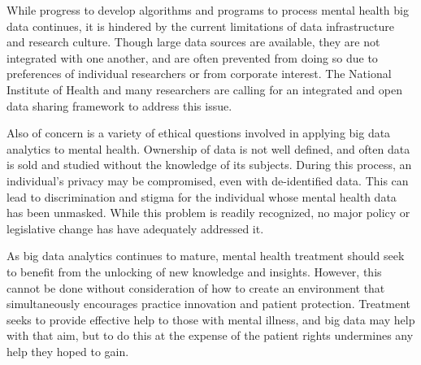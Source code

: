 \documentclass[sigconf]{acmart}
\begin{document}
While progress to develop algorithms and programs to process mental health big data continues, it is hindered by the current limitations of data infrastructure and research culture. Though large data sources are available, they are not integrated with one another, and are often prevented from doing so due to preferences of individual researchers or from corporate interest. The National Institute of Health and many researchers are calling for an integrated and open data sharing framework to address this issue.

Also of concern is a variety of ethical questions involved in applying big data analytics to mental health. Ownership of data is not well defined, and often data is sold and studied without the knowledge of its subjects. During this process, an individual's privacy may be compromised, even with de-identified data. This can lead to discrimination and stigma for the individual whose mental health data has been unmasked. While this problem is readily recognized, no major policy or legislative change has have adequately addressed it. 

As big data analytics continues to mature, mental health treatment should seek to benefit from the unlocking of new knowledge and insights. However, this cannot be done without consideration of how to create an environment that simultaneously encourages practice innovation and patient protection. Treatment seeks to provide effective help to those with mental illness, and big data may help with that aim, but to do this at the expense of the patient rights undermines any help they hoped to gain.



\begin{acks}

\end{acks}


 
\end{document}
